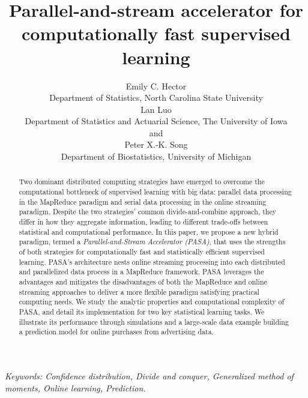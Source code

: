 \documentclass[12pt]{article}
\begin{document}
\begin{singlespace}

\title{\bf Parallel-and-stream accelerator for computationally fast supervised learning}

\author{Emily C. Hector \\Department of Statistics, North Carolina State University\\
Lan Luo \\ Department of Statistics and Actuarial Science, The University of Iowa\\
and\\
Peter X.-K. Song\\Department of Biostatistics, University of Michigan}

\date{}

\maketitle

\begin{abstract}
Two dominant distributed computing strategies have emerged to overcome the computational bottleneck of supervised learning with big data: parallel data processing in the MapReduce paradigm and serial data processing in the online streaming paradigm. Despite the two strategies' common divide-and-combine approach, they differ in how they aggregate information, leading to different trade-offs between statistical and computational performance. In this paper, we propose a new hybrid paradigm, termed a {\em Parallel-and-Stream Accelerator (PASA)}, that uses the strengths of both strategies for computationally fast and statistically efficient supervised learning. PASA's architecture nests online streaming processing into each distributed and parallelized data process in a MapReduce framework. PASA leverages the advantages and mitigates the disadvantages of both the MapReduce and online streaming approaches to deliver a more flexible paradigm satisfying practical computing needs. We study the analytic properties and computational complexity of PASA, and detail its implementation for two key statistical learning tasks. We illustrate its performance through simulations and a large-scale data example building a prediction model for online purchases from advertising data.
\end{abstract}

\noindent%
{\it Keywords: Confidence distribution, Divide and conquer, Generalized method of moments, Online learning, Prediction.
}

\end{singlespace}
\end{document}
